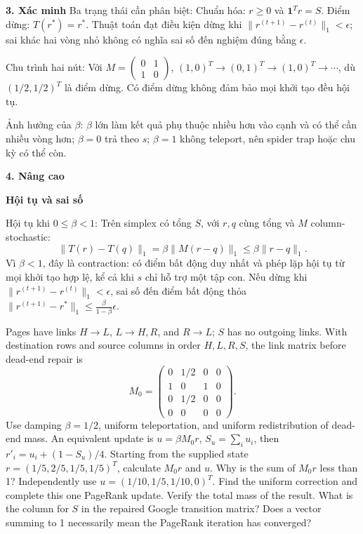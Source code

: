 \documentclass[10pt,a4paper,twocolumn]{article}
\newcommand{\key}[1]{#1:\enspace}
\newcommand{\advancedheading}[1]{%
  \par\addvspace{4pt}\noindent\textbf{#1}\par\nobreak\addvspace{1pt}}
\newcommand{\unitheading}[2]{%
  \par\addvspace{1pt}\noindent\textbf{#1. #2}\enspace}
\newcommand{\unitverification}{\unitheading{3}{Xác minh}}
\newcommand{\unitadvanced}{\unitheading{4}{Nâng cao}}
\begin{document}

\unitverification
\key{Ba trạng thái cần phân biệt} Chuẩn hóa: $r\ge0$ và $\mathbf1^Tr=S$. Điểm dừng: $T(r^*)=r^*$. Thuật toán đạt điều kiện dừng khi $\|r^{(t+1)}-r^{(t)}\|_1<\epsilon$; sai khác hai vòng nhỏ không có nghĩa sai số đến nghiệm đúng bằng $\epsilon$.

\key{Chu trình hai nút} Với $M=\left(\begin{smallmatrix}0&1\\1&0\end{smallmatrix}\right)$, $(1,0)^T\to(0,1)^T\to(1,0)^T\to\cdots$, dù $(1/2,1/2)^T$ là điểm dừng. Có điểm dừng không đảm bảo mọi khởi tạo đều hội tụ.

\key{Ảnh hưởng của $\beta$} $\beta$ lớn làm kết quả phụ thuộc nhiều hơn vào cạnh và có thể cần nhiều vòng hơn; $\beta=0$ trả theo $s$; $\beta=1$ không teleport, nên spider trap hoặc chu kỳ có thể còn.

\unitadvanced
\advancedheading{Hội tụ và sai số}

\key{Hội tụ khi $0\le\beta<1$} Trên simplex có tổng $S$, với $r,q$ cùng tổng và $M$ column-stochastic:
\[
\|T(r)-T(q)\|_1
=\beta\|M(r-q)\|_1
\le\beta\|r-q\|_1.
\]
Vì $\beta<1$, đây là contraction: có điểm bất động duy nhất và phép lặp hội tụ từ mọi khởi tạo hợp lệ, kể cả khi $s$ chỉ hỗ trợ một tập con. Nếu dừng khi $\|r^{(t+1)}-r^{(t)}\|_1<\epsilon$, sai số đến điểm bất động thỏa $\|r^{(t+1)}-r^*\|_1\le\frac{\beta}{1-\beta}\epsilon$.

Pages have links $H\to L$, $L\to H,R$, and $R\to L$; $S$ has no outgoing links. With destination rows and source columns in order $H,L,R,S$, the link matrix before dead-end repair is
\[
M_0=\begin{pmatrix}0&1/2&0&0\\1&0&1&0\\0&1/2&0&0\\0&0&0&0\end{pmatrix}.
\]
Use damping $\beta=1/2$, uniform teleportation, and uniform redistribution of dead-end mass. An equivalent update is $u=\beta M_0r$, $S_u=\sum_i u_i$, then $r'_i=u_i+(1-S_u)/4$.
 Starting from the supplied state $r=(1/5,2/5,1/5,1/5)^T$, calculate $M_0r$ and $u$. Why is the sum of $M_0r$ less than 1?
 Independently use $u=(1/10,1/5,1/10,0)^T$. Find the uniform correction and complete this one PageRank update. Verify the total mass of the result.
 What is the column for $S$ in the repaired Google transition matrix? Does a vector summing to 1 necessarily mean the PageRank iteration has converged?
\end{document}
